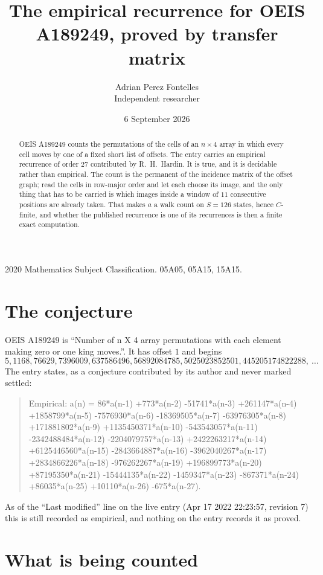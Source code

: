 \documentclass[11pt,a4paper]{article}
\title{The empirical recurrence for OEIS A189249, proved by transfer matrix}
\author{Adrian Perez Fontelles\\ \small Independent researcher}
\date{6 September 2026}
\theoremstyle{plain}
\theoremstyle{definition}
\begin{document}
\maketitle

\begin{abstract}
OEIS A189249 counts the permutations of the cells of an $n\times4$ array in which every cell
moves by one of a fixed short list of offsets. The entry carries an empirical recurrence of
order $27$ contributed by R.~H.~Hardin. It is true, and it is decidable rather than
empirical. The count is the permanent of the incidence matrix of the offset graph; read the
cells in row-major order and let each choose its image, and the only thing that has to be
carried is which images inside a window of $11$ consecutive positions are already taken.
That makes $a$ a walk count on $S=126$ states, hence $C$-finite, and whether the published
recurrence is one of its recurrences is then a finite exact computation.
\end{abstract}

\noindent\small 2020 Mathematics Subject Classification. 05A05, 05A15, 15A15.\normalsize

\section{The conjecture}

OEIS A189249 is ``Number of n X 4 array permutations with each element making zero or one king moves.''. It has offset $1$ and begins
\[
5, 1168, 76629, 7396009, 637586496, 56892084785, 5025023852501, 445205174822288,\ \dots
\]
The entry states, as a conjecture contributed by its author and never marked settled:
\begin{quote}
Empirical: a(n) = 86*a(n-1) +773*a(n-2) -51741*a(n-3) +261147*a(n-4) +1858799*a(n-5) -7576930*a(n-6) -18369505*a(n-7) -63976305*a(n-8) +171881802*a(n-9) +1135450371*a(n-10) -543543057*a(n-11) -2342488484*a(n-12) -2204079757*a(n-13) +2422263217*a(n-14) +6125446560*a(n-15) -2843664887*a(n-16) -3962040267*a(n-17) +2834866226*a(n-18) -976262267*a(n-19) +196899773*a(n-20) +87195350*a(n-21) -15444135*a(n-22) -1459347*a(n-23) -867371*a(n-24) +86035*a(n-25) +10110*a(n-26) -675*a(n-27).
\end{quote}
As of the ``Last modified'' line on the live entry (Apr 17 2022 22:23:57, revision 7) this is still
recorded as empirical, and nothing on the entry records it as proved.

\section{What is being counted}
\end{document}

